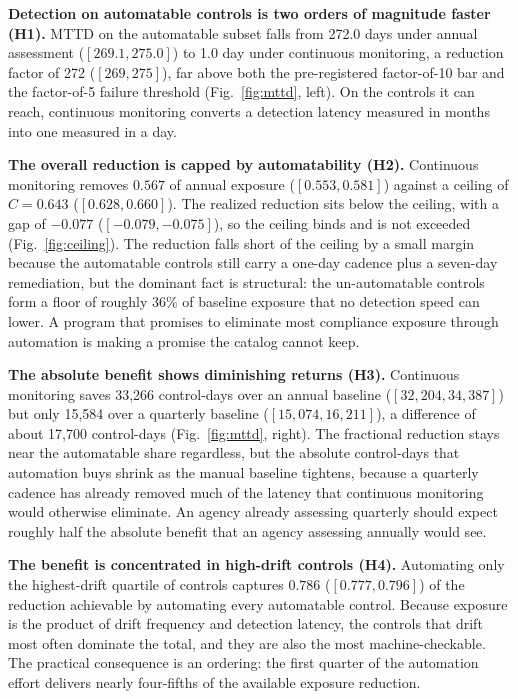 \documentclass[journal]{IEEEtran}
\begin{document}
\textbf{Detection on automatable controls is two orders of magnitude faster (H1).} MTTD on the
automatable subset falls from 272.0 days under annual assessment ($[269.1, 275.0]$) to 1.0 day
under continuous monitoring, a reduction factor of 272 ($[269, 275]$), far above both the
pre-registered factor-of-10 bar and the factor-of-5 failure threshold
(Fig.~\ref{fig:mttd}, left). On the controls it can reach, continuous monitoring converts a
detection latency measured in months into one measured in a day.

\textbf{The overall reduction is capped by automatability (H2).} Continuous monitoring removes
$0.567$ of annual exposure ($[0.553, 0.581]$) against a ceiling of $C = 0.643$ ($[0.628, 0.660]$).
The realized reduction sits below the ceiling, with a gap of $-0.077$ ($[-0.079, -0.075]$), so the
ceiling binds and is not exceeded (Fig.~\ref{fig:ceiling}). The reduction falls short of the ceiling
by a small margin because the automatable controls still carry a one-day cadence plus a seven-day
remediation, but the dominant fact is structural: the un-automatable controls form a floor of
roughly 36\% of baseline exposure that no detection speed can lower. A program that promises to
eliminate most compliance exposure through automation is making a promise the catalog cannot keep.

\textbf{The absolute benefit shows diminishing returns (H3).} Continuous monitoring saves
33{,}266 control-days over an annual baseline ($[32{,}204, 34{,}387]$) but only 15{,}584 over a
quarterly baseline ($[15{,}074, 16{,}211]$), a difference of about 17{,}700 control-days
(Fig.~\ref{fig:mttd}, right). The fractional reduction stays near the automatable share regardless,
but the absolute control-days that automation buys shrink as the manual baseline tightens, because
a quarterly cadence has already removed much of the latency that continuous monitoring would
otherwise eliminate. An agency already assessing quarterly should expect roughly half the absolute
benefit that an agency assessing annually would see.

\textbf{The benefit is concentrated in high-drift controls (H4).} Automating only the
highest-drift quartile of controls captures $0.786$ ($[0.777, 0.796]$) of the reduction achievable
by automating every automatable control. Because exposure is the product of drift frequency and
detection latency, the controls that drift most often dominate the total, and they are also the
most machine-checkable. The practical consequence is an ordering: the first quarter of the
automation effort delivers nearly four-fifths of the available exposure reduction.
\end{document}
